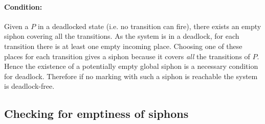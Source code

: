 \documentclass[a4paper]{report}
\numberwithin{algorithm}{chapter}
\begin{document}
\paragraph{Condition\cite{Commoner72,fcbook}:}
Given a \pn{} $P$ in a deadlocked state (i.e. no transition can fire), there exists an empty siphon covering all the transitions.
As the system is in a deadlock, for each transition there is at least one empty incoming place.
Choosing one of these places for each transition gives a siphon because it covers \emph{all} the transitions of $P$.
Hence the existence of a potentially empty global siphon is a necessary condition for deadlock.
Therefore if no marking with such a siphon is reachable the system is deadlock-free.

\subsection{Checking for emptiness of siphons}
\label{checkSiphon}
\end{document}
